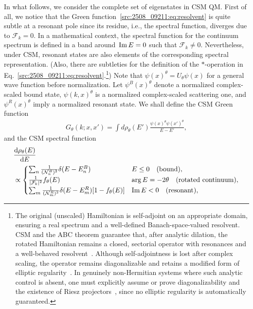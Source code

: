In what follows, we consider the complete set of eigenstates in CSM QM. First of all, we notice that the Green function~\eqref{src:2508_09211:eq:resolvent} is quite subtle at a resonant pole since its residue, i.e., the spectral function, diverges due to $\mathcal{F}_k=0$. In a mathematical context, the spectral function for the continuum spectrum is defined in a band around~$\operatorname{Im} E=0$ such that $\mathcal{F}_k\neq0$. Nevertheless, under CSM, resonant states are also elements of the corresponding spectral representation. (Also, there are subtleties for the definition of the $*$-operation in Eq.~\eqref{src:2508_09211:eq:resolvent}.\footnote{The original (unscaled) Hamiltonian is self-adjoint on an appropriate domain, ensuring a real spectrum and a well-defined Banach-space-valued resolvent. CSM and the ABC theorem guarantee that, after analytic dilation, the rotated Hamiltonian remains a closed, sectorial operator with resonances and a well-behaved resolvent~\cite{Davies:07}. Although self-adjointness is lost after complex scaling, the operator remains diagonalizable and retains a modified form of elliptic regularity~\cite{Gelfand:1964}.
In genuinely non-Hermitian systems where such analytic control is absent, one must explicitly assume or prove diagonalizability and the existence of Riesz projectors~\cite{Trefethen1999,Davies:2002}, since no elliptic regularity is automatically guaranteed.})
Note that $\psi(x)^\theta=U_\theta\psi(x)$ for a general wave function before normalization. Let $\psi^B(x)^\theta$ denote a normalized complex-scaled bound state, $\psi(k,x)^\theta$ is a normalized complex-scaled scattering one, and $\psi^R(x)^\theta$ imply a normalized resonant state.
We shall define the CSM Green function
\begin{align}
    G_\theta(k;x,x') = \int d\rho_\theta(E') \frac{\psi(x)^\theta\psi(x')^\theta}{E-E'} ,
    \label{src:2508_09211:eq:resolvent_csm}
\end{align}
and the CSM spectral function
\begin{align}
    &\frac{\mathrm{d} \rho_\theta(E)}{\mathrm{d} E} \notag\\ &\propto
    \begin{cases}
        \sum_{n} \frac{1}{(\mathcal{N}_n^B)^2} \delta(E-E_n^B) & E\leq0 \quad \text{(bound)},\\
        \frac{1}{|\mathcal{F}_k|^2} f_\theta(E) & \arg E=-2\theta \quad \text{(rotated continuum)},\\
        \sum_{m} \frac{1}{(\mathcal{N}_m^R)^2} \delta(E-E_m^R) [1-f_\theta(E)] & \operatorname{Im} E<0 \quad \text{(resonant)}, 
    \end{cases}
\end{align}
